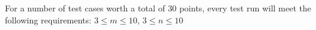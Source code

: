 For a number of test cases worth a total of 30 points, every test run will meet the following requirements: $3 \le m \le 10$, $3 \le n \le 10$